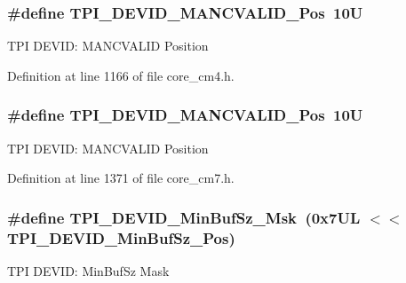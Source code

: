 \subsubsection[{\texorpdfstring{T\+P\+I\+\_\+\+D\+E\+V\+I\+D\+\_\+\+M\+A\+N\+C\+V\+A\+L\+I\+D\+\_\+\+Pos}{TPI_DEVID_MANCVALID_Pos}}]{\setlength{\rightskip}{0pt plus 5cm}\#define T\+P\+I\+\_\+\+D\+E\+V\+I\+D\+\_\+\+M\+A\+N\+C\+V\+A\+L\+I\+D\+\_\+\+Pos~10U}\hypertarget{group___c_m_s_i_s___t_p_i_ga675534579d9e25477bb38970e3ef973c}{}\label{group___c_m_s_i_s___t_p_i_ga675534579d9e25477bb38970e3ef973c}
T\+PI D\+E\+V\+ID\+: M\+A\+N\+C\+V\+A\+L\+ID Position 

Definition at line 1166 of file core\+\_\+cm4.\+h.

\subsubsection[{\texorpdfstring{T\+P\+I\+\_\+\+D\+E\+V\+I\+D\+\_\+\+M\+A\+N\+C\+V\+A\+L\+I\+D\+\_\+\+Pos}{TPI_DEVID_MANCVALID_Pos}}]{\setlength{\rightskip}{0pt plus 5cm}\#define T\+P\+I\+\_\+\+D\+E\+V\+I\+D\+\_\+\+M\+A\+N\+C\+V\+A\+L\+I\+D\+\_\+\+Pos~10U}\hypertarget{group___c_m_s_i_s___t_p_i_ga675534579d9e25477bb38970e3ef973c}{}\label{group___c_m_s_i_s___t_p_i_ga675534579d9e25477bb38970e3ef973c}
T\+PI D\+E\+V\+ID\+: M\+A\+N\+C\+V\+A\+L\+ID Position 

Definition at line 1371 of file core\+\_\+cm7.\+h.

\subsubsection[{\texorpdfstring{T\+P\+I\+\_\+\+D\+E\+V\+I\+D\+\_\+\+Min\+Buf\+Sz\+\_\+\+Msk}{TPI_DEVID_MinBufSz_Msk}}]{\setlength{\rightskip}{0pt plus 5cm}\#define T\+P\+I\+\_\+\+D\+E\+V\+I\+D\+\_\+\+Min\+Buf\+Sz\+\_\+\+Msk~(0x7\+U\+L $<$$<$ T\+P\+I\+\_\+\+D\+E\+V\+I\+D\+\_\+\+Min\+Buf\+Sz\+\_\+\+Pos)}\hypertarget{group___c_m_s_i_s___t_p_i_ga939e068ff3f1a65b35187ab34a342cd8}{}\label{group___c_m_s_i_s___t_p_i_ga939e068ff3f1a65b35187ab34a342cd8}
T\+PI D\+E\+V\+ID\+: Min\+Buf\+Sz Mask 


